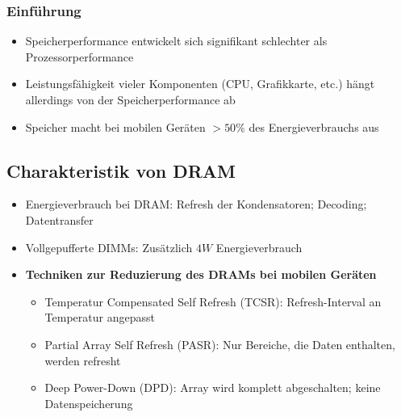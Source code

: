 \subsubsection{Einführung}
\begin{itemize}
	\item Speicherperformance entwickelt sich signifikant schlechter als Prozessorperformance
	\item Leistungsfähigkeit vieler Komponenten (CPU, Grafikkarte, etc.) hängt allerdings von der Speicherperformance ab
	\item Speicher macht bei mobilen Geräten \(>50\%\) des Energieverbrauchs aus
\end{itemize}

\subsection{Charakteristik von DRAM}
\begin{itemize}
	\item Energieverbrauch bei DRAM: Refresh der Kondensatoren; Decoding; Datentransfer
	\item Vollgepufferte DIMMs: Zusätzlich \(4W\) Energieverbrauch
	\item \textbf{Techniken zur Reduzierung des DRAMs bei mobilen Geräten}
	\begin{itemize}
		\item Temperatur Compensated Self Refresh (TCSR): Refresh-Interval an Temperatur angepasst
		\item Partial Array Self Refresh (PASR): Nur Bereiche, die Daten enthalten, werden refresht
		\item Deep Power-Down (DPD): Array wird komplett abgeschalten; keine Datenspeicherung
	\end{itemize}
\end{itemize}


